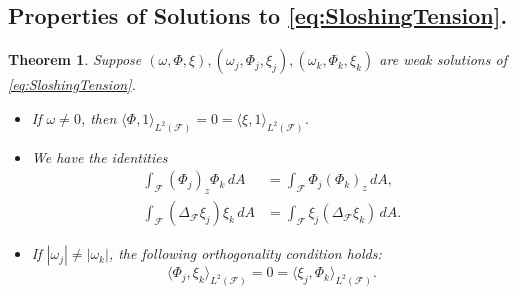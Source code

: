 \documentclass[letterpaper, 12pt]{amsart}
\newtheorem{theorem}[definition]{Theorem}
\newcommand{\F}{\mathcal{F}}
\begin{document}
\subsection{Properties of Solutions to \eqref{eq:SloshingTension}.} \label{sec:Prelim_Properties}
\begin{theorem} \label{thm:Property1}
Suppose $(\omega,\Phi,\xi), (\omega_j,\Phi_j,\xi_j), (\omega_k,\Phi_k,\xi_k)$ are weak solutions of \eqref{eq:SloshingTension}. 
\begin{itemize}
\item[(a)] If $\omega\neq 0$, then $\langle\Phi,1\rangle_{L^2(\F)} = 0 = \langle\xi,1\rangle_{L^2(\F)}$.
\item[(b)] We have the identities 
\begin{subequations}\label{eq:P1swap}
\begin{align}
\label{eq:P1swap1} \int_\F (\Phi_j)_z\Phi_k\, dA & = \int_\F \Phi_j(\Phi_k)_z\, dA, \\
\label{eq:P1swap2} \int_\F (\Delta_\F\xi_j)\xi_k\, dA & = \int_\F \xi_j(\Delta_\F\xi_k)\, dA.
\end{align}
\end{subequations}
\item[(c)] If $|\omega_j|\neq |\omega_k|$, the following orthogonality condition holds: 
\begin{equation}
\label{eq:P2ortho} \langle\Phi_j, \xi_k\rangle_{L^2(\F)} = 0 = \langle\xi_j, \Phi_k\rangle_{L^2(\F)}. 
\end{equation}
\end{itemize}
\end{theorem}
\end{document}
